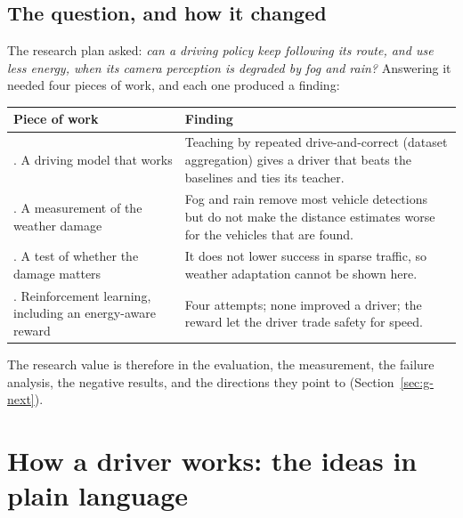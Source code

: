\subsection{The question, and how it changed}
The research plan asked: \emph{can a driving policy keep following its route, and use less energy, when its camera perception is degraded by fog and rain?} Answering it needed four pieces of work, and each one produced a finding:
\begin{center}\small
\begin{tabularx}{\textwidth}{@{}>{\raggedright\arraybackslash}p{4.6cm}X@{}}\toprule
Piece of work & Finding\\\midrule
1. A driving model that works & Teaching by repeated drive-and-correct (dataset aggregation) gives a driver that beats the baselines and ties its teacher.\\
2. A measurement of the weather damage & Fog and rain remove most vehicle detections but do not make the distance estimates worse for the vehicles that are found.\\
3. A test of whether the damage matters & It does not lower success in sparse traffic, so weather adaptation cannot be shown here.\\
4. Reinforcement learning, including an energy-aware reward & Four attempts; none improved a driver; the reward let the driver trade safety for speed.\\\bottomrule
\end{tabularx}
\end{center}
The research value is therefore in the evaluation, the measurement, the failure analysis, the negative results, and the directions they point to (Section~\ref{sec:g-next}).

\section{How a driver works: the ideas in plain language}

